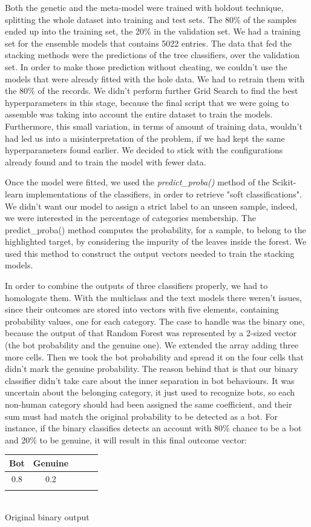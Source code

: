 Both the genetic and the meta-model were trained with holdout technique, splitting the whole dataset into training and test sets. The 80\% of the samples ended up into the training set, the 20\% in the validation set.
We had a training set for the ensemble models that contains 5022 entries.
The data that fed the stacking methods were the predictions of the tree classifiers, over the validation set.
In order to make those prediction without cheating, we couldn't use the models that were already fitted with the hole data. We had to retrain them with the 80\% of the records. 
We didn't perform further Grid Search to find the best hyperparameters in this stage, because the final script that we were going to assemble was taking into account the entire dataset to train the models. Furthermore, this small variation, in terms of amount of training data, wouldn't had led us into a misinterpretation of the problem, if we had kept the same hyperparameters found earlier.
We decided to stick with the configurations already found and to train the model with fewer data.

Once the model were fitted, we used the \textit{predict\_proba()} method of the Scikit-learn implementations of the classifiers, in order to retrieve "soft classifications".
We didn't want our model to assign a strict label to an unseen sample, indeed, we were interested in the percentage of categories membership.
The predict\_proba() method computes the probability, for a sample, to belong to the highlighted target, by considering the impurity of the leaves inside the forest.
We used this method to construct the output vectors needed to train the stacking models.

In order to combine the outputs of three classifiers properly, we had to homologate them.
With the multiclass and the text models there weren't issues, since their outcomes are stored into vectors with five elements, containing probability values, one for each category.
The case to handle was the binary one, because the output of that Random Forest was represented by a 2-sized vector (the bot probability and the genuine one).
We extended the array adding three more cells. Then we took the bot probability and spread it on the four cells that didn't mark the genuine probability.
The reason behind that is that our binary classifier didn't take care about the inner separation in bot behaviours. It was uncertain about the belonging category, it just used to recognize bots, so each non-human category should had been assigned the same coefficient, and their sum must had match the original probability to be detected as a bot.
For instance, if the binary classifies detects an account with 80\% chance to be a bot and 20\% to be genuine, it will result in this final outcome vector:
\begin{center}
	\begin{tabular}{ccccc}
		\\Bot&Genuine\\
		\hline
		0.8&0.2\\
		\hline\\
	\end{tabular}\\
Original binary output
\end{center}
	
